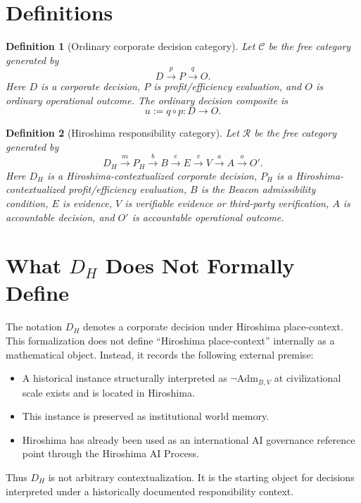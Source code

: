 \documentclass[11pt]{article}
\newtheorem{definition}{Definition}
\begin{document}
\section*{Definitions}

\begin{definition}[Ordinary corporate decision category]
Let $\mathcal{C}$ be the free category generated by
\[
  D \xrightarrow{p} P \xrightarrow{q} O.
\]
Here $D$ is a corporate decision, $P$ is profit/efficiency evaluation, and $O$
is ordinary operational outcome.  The ordinary decision composite is
\[
  u:=q\circ p:D\to O.
\]
\end{definition}

\begin{definition}[Hiroshima responsibility category]
Let $\mathcal{R}$ be the free category generated by
\[
  D_H \xrightarrow{m} P_H \xrightarrow{b} B
  \xrightarrow{e} E \xrightarrow{v} V \xrightarrow{a} A
  \xrightarrow{o} O'.
\]
Here $D_H$ is a Hiroshima-contextualized corporate decision, $P_H$ is a
Hiroshima-contextualized profit/efficiency evaluation, $B$ is the Beacon
admissibility condition, $E$ is evidence, $V$ is verifiable evidence or
third-party verification, $A$ is accountable decision, and $O'$ is accountable
operational outcome.
\end{definition}

\section*{What $D_H$ Does Not Formally Define}

The notation $D_H$ denotes a corporate decision under Hiroshima place-context.
This formalization does not define ``Hiroshima place-context'' internally as a
mathematical object.  Instead, it records the following external premise:

\begin{itemize}
  \item A historical instance structurally interpreted as
  $\neg\mathrm{Adm}_{B,V}$ at civilizational scale exists and is located in
  Hiroshima.
  \item This instance is preserved as institutional world memory.
  \item Hiroshima has already been used as an international AI governance
  reference point through the Hiroshima AI Process.
\end{itemize}

Thus $D_H$ is not arbitrary contextualization.  It is the starting object for
decisions interpreted under a historically documented responsibility context.
\end{document}

